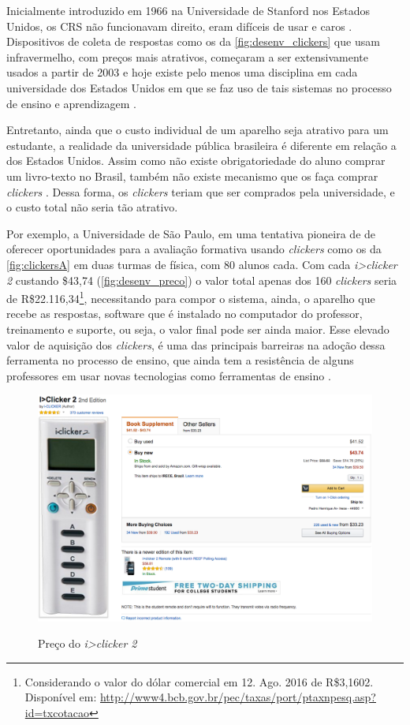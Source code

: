 Inicialmente introduzido em 1966 na Universidade de Stanford nos Estados Unidos, os CRS
não funcionavam direito, eram difíceis de usar e caros \cite{Kay2009}. Dispositivos
de coleta de respostas como os da \autoref{fig:desenv_clickers} que usam infravermelho, com preços mais
atrativos, começaram a ser extensivamente usados a partir de 2003 e hoje existe pelo menos
uma disciplina em cada universidade dos Estados Unidos em que se faz uso de tais sistemas
no processo de ensino e aprendizagem \cite{Abrahamson2014}.

Entretanto, ainda que o custo individual de um aparelho seja atrativo para um
estudante, a realidade da universidade pública brasileira é diferente em relação
a dos Estados Unidos. Assim como não existe obrigatoriedade do aluno comprar um
livro-texto no Brasil, também não existe mecanismo que os faça
comprar \textit{clickers} \cite{GerdKortemeyerEmersonCruz2011}. Dessa forma, os \textit{clickers}
teriam que ser comprados pela universidade, e o custo total não seria tão atrativo.

Por exemplo, a Universidade de São Paulo, em uma tentativa pioneira de
 de oferecer oportunidades para a avaliação
formativa usando \textit{clickers} como os da \autoref{fig:clickersA} em duas
turmas de física, com 80 alunos cada. Com cada \textit{i>clicker 2}
custando \$43,74 (\autoref{fig:desenv_preco})
o valor total apenas dos 160 \textit{clickers} seria de
R\$22.116,34\footnote{Considerando o valor do dólar comercial em 12. Ago. 2016
de R\$3,1602. Disponível em: \href{http://www4.bcb.gov.br/pec/taxas/port/ptaxnpesq.asp?id=txcotacao}{http://www4.bcb.gov.br/pec/taxas/port/ptaxnpesq.asp?id=txcotacao}},
necessitando para compor o sistema, ainda, o aparelho que recebe as respostas, software que é instalado
no computador do professor, treinamento e suporte, ou seja, o valor final pode ser
ainda maior. Esse elevado valor de aquisição dos \textit{clickers}, é uma das principais barreiras na adoção dessa
ferramenta no processo de ensino, que ainda tem a resistência de alguns professores
em usar novas tecnologias como ferramentas de ensino \cite{Moratelli2014, Blasco-Arcas2013, Strasser2010, GerdKortemeyerEmersonCruz2011, Kay2009}.

\begin{figure}[!t]
  \centering
  \caption{Preço do \textit{i>clicker 2}}
  \includegraphics[width=.75\textwidth]{imagens/desenv_preco}
  \label{fig:desenv_preco}
\end{figure}

